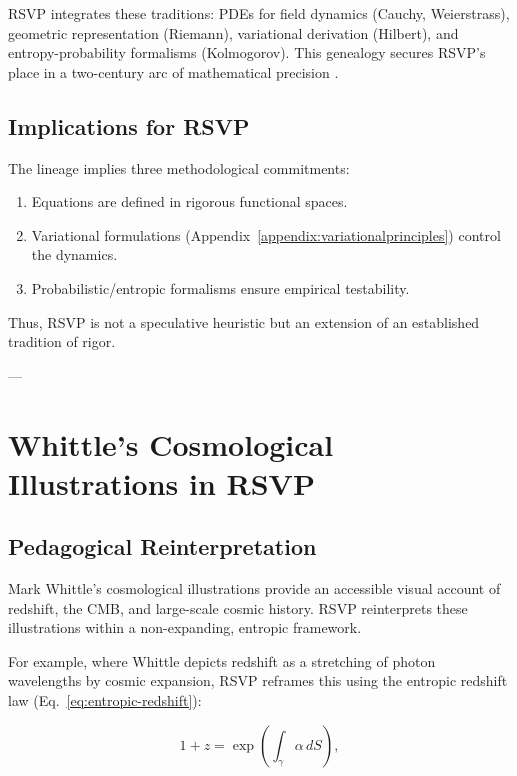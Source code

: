 \documentclass[12pt]{report}
\begin{document}
RSVP integrates these traditions: PDEs for field dynamics (Cauchy, Weierstrass), geometric representation (Riemann), variational derivation (Hilbert), and entropy-probability formalisms (Kolmogorov). This genealogy secures RSVP’s place in a two-century arc of mathematical precision \citep{RSVPMeta2025}.

\section{Implications for RSVP}

The lineage implies three methodological commitments:

\begin{enumerate}
    \item Equations are defined in rigorous functional spaces.  
    \item Variational formulations (Appendix~\ref{appendix:variationalprinciples}) control the dynamics.  
    \item Probabilistic/entropic formalisms ensure empirical testability.  
\end{enumerate}

Thus, RSVP is not a speculative heuristic but an extension of an established tradition of rigor.

---

\chapter{Whittle’s Cosmological Illustrations in RSVP}
\label{app:Z}

\section{Pedagogical Reinterpretation}

Mark Whittle’s cosmological illustrations \citep{Whittle2008} provide an accessible visual account of redshift, the CMB, and large-scale cosmic history. RSVP reinterprets these illustrations within a non-expanding, entropic framework.  

For example, where Whittle depicts redshift as a stretching of photon wavelengths by cosmic expansion, RSVP reframes this using the entropic redshift law (Eq.~\ref{eq:entropic-redshift}):

\begin{equation}
1+z = \exp\!\left(\int_\gamma \alpha \, dS \right),
\end{equation}
\end{document}
